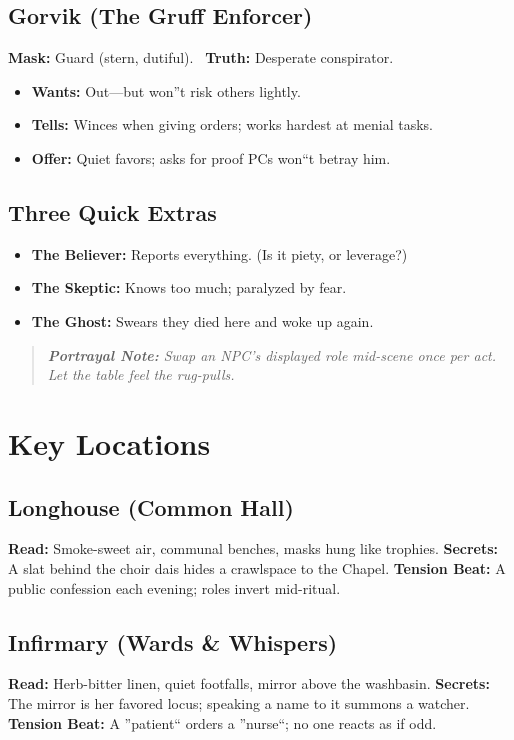 \documentclass[11pt]{article}
\newenvironment{callout}
{\begin{quote}\itshape\small\color{gray!40!black}}
{\end{quote}}
\begin{document}
\subsection{Gorvik (The Gruff Enforcer)}
\textbf{Mask:} Guard (stern, dutiful). \ \textbf{Truth:} Desperate conspirator.
\begin{itemize}
  \item \textbf{Wants:} Out---but won''t risk others lightly.
  \item \textbf{Tells:} Winces when giving orders; works hardest at menial tasks.
  \item \textbf{Offer:} Quiet favors; asks for proof PCs won``t betray him.
\end{itemize}

\subsection{Three Quick Extras}
\begin{itemize}
  \item \textbf{The Believer:} Reports everything. (Is it piety, or leverage?)
  \item \textbf{The Skeptic:} Knows too much; paralyzed by fear.
  \item \textbf{The Ghost:} Swears they died here and woke up again.
\end{itemize}

\begin{callout}
\textbf{Portrayal Note:} Swap an NPC's displayed role mid-scene once per act. Let the table feel the rug-pulls.
\end{callout}

\section{Key Locations}
\subsection{Longhouse (Common Hall)}
\textbf{Read:} Smoke-sweet air, communal benches, masks hung like trophies.  
\textbf{Secrets:} A slat behind the choir dais hides a crawlspace to the Chapel.  
\textbf{Tension Beat:} A public confession each evening; roles invert mid-ritual.

\subsection{Infirmary (Wards \& Whispers)}
\textbf{Read:} Herb-bitter linen, quiet footfalls, mirror above the washbasin.  
\textbf{Secrets:} The mirror is her favored locus; speaking a name to it summons a watcher.  
\textbf{Tension Beat:} A ''patient`` orders a ''nurse``; no one reacts as if odd.
\end{document}
